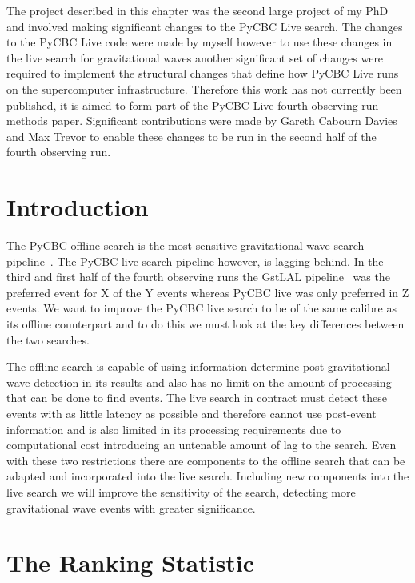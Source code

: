 The project described in this chapter was the second large project of my PhD and involved making significant changes to the PyCBC Live search. The changes to the PyCBC Live code were made by myself however to use these changes in the live search for gravitational waves another significant set of changes were required to implement the structural changes that define how PyCBC Live runs on the supercomputer infrastructure. Therefore this work has not currently been published, it is aimed to form part of the PyCBC Live fourth observing run methods paper. Significant contributions were made by Gareth Cabourn Davies and Max Trevor to enable these changes to be run in the second half of the fourth observing run.

\section{\label{sec:pycbclive-introduction}Introduction}

The PyCBC offline search is the most sensitive gravitational wave search pipeline~\cite{PyCBC:2016, PyCBC:2017, PyCBC_package:2021}. The PyCBC live search pipeline however, is lagging behind. In the third and first half of the fourth observing runs the GstLAL pipeline~\cite{GstLAL:2020} was the preferred event for X of the Y events whereas PyCBC live was only preferred in Z events. We want to improve the PyCBC live search to be of the same calibre as its offline counterpart and to do this we must look at the key differences between the two searches.

The offline search is capable of using information determine post-gravitational wave detection in its results and also has no limit on the amount of processing that can be done to find events. The live search in contract must detect these events with as little latency as possible and therefore cannot use post-event information and is also limited in its processing requirements due to computational cost introducing an untenable amount of lag to the search. Even with these two restrictions there are components to the offline search that can be adapted and incorporated into the live search. Including new components into the live search we will improve the sensitivity of the search, detecting more gravitational wave events with greater significance.

\section{\label{sec:pycbclive-ranking-stat}The Ranking Statistic}

